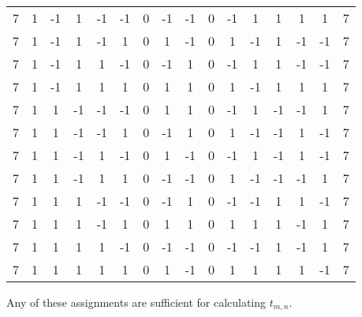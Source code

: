 \documentclass[12pt]{article}
\theoremstyle{plain}
\theoremstyle{definition}
\theoremstyle{remark}
\theoremstyle{definition}
\begin{document}
\begin{center}
\begin{tabular}{|c|c|c|c|c|c|c|c|c|c|c|c|c|c|c|c|}
7 & 1 & -1 & 1 & -1 & -1 & 0 & -1 & -1 & 0 & -1 & 1 & 1 & 1 & 1 & 7 \\
7 & 1 & -1 & 1 & -1 & 1 & 0 & 1 & -1 & 0 & 1 & -1 & 1 & -1 & -1 & 7 \\
7 & 1 & -1 & 1 & 1 & -1 & 0 & -1 & 1 & 0 & -1 & 1 & 1 & -1 & -1 & 7 \\
7 & 1 & -1 & 1 & 1 & 1 & 0 & 1 & 1 & 0 & 1 & -1 & 1 & 1 & 1 & 7 \\
7 & 1 & 1 & -1 & -1 & -1 & 0 & 1 & 1 & 0 & -1 & 1 & -1 & -1 & 1 & 7 \\
7 & 1 & 1 & -1 & -1 & 1 & 0 & -1 & 1 & 0 & 1 & -1 & -1 & 1 & -1 & 7 \\
7 & 1 & 1 & -1 & 1 & -1 & 0 & 1 & -1 & 0 & -1 & 1 & -1 & 1 & -1 & 7 \\
7 & 1 & 1 & -1 & 1 & 1 & 0 & -1 & -1 & 0 & 1 & -1 & -1 & -1 & 1 & 7 \\
7 & 1 & 1 & 1 & -1 & -1 & 0 & -1 & 1 & 0 & -1 & -1 & 1 & 1 & -1 & 7 \\
7 & 1 & 1 & 1 & -1 & 1 & 0 & 1 & 1 & 0 & 1 & 1 & 1 & -1 & 1 & 7 \\
7 & 1 & 1 & 1 & 1 & -1 & 0 & -1 & -1 & 0 & -1 & -1 & 1 & -1 & 1 & 7 \\
7 & 1 & 1 & 1 & 1 & 1 & 0 & 1 & -1 & 0 & 1 & 1 & 1 & 1 & -1 & 7 \\
\hline
\end{tabular}
\end{center}

Any of these assignments are sufficient for calculating $t_{m,n}$. 
\end{document}
